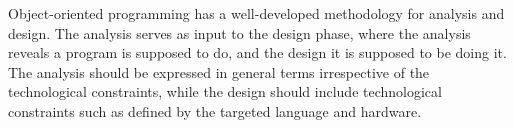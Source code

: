 \documentclass[fsharpNotes.tex]{subfiles}
\begin{document}
Object-oriented programming has a well-developed methodology for analysis and design. The analysis serves as input to the design phase, where the analysis reveals  a program is supposed to do, and the design  it is supposed to be doing it. The analysis should be expressed in general terms irrespective of the technological constraints, while the design should include technological constraints such as defined by the targeted language and hardware.
\end{document}
